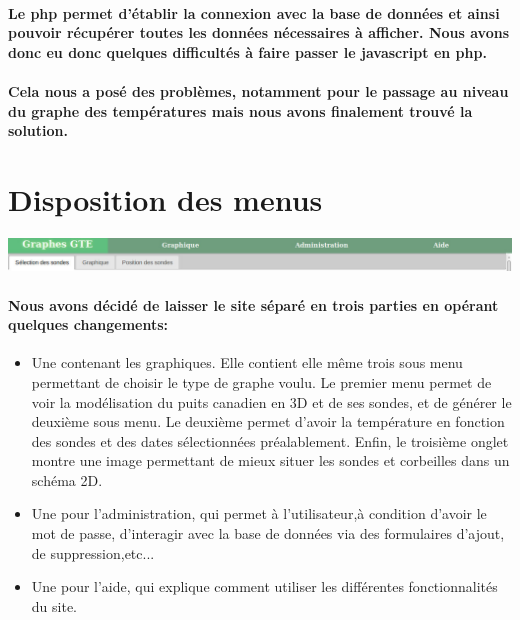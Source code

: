 \documentclass[12pt , a4paper,titlepage]{report}
\begin{document}
 \paragraph{Le php permet d’établir la connexion avec la base de données et
ainsi pouvoir récupérer toutes les données nécessaires à afficher. Nous avons donc eu donc quelques difficultés à faire passer le 
javascript en php.}
 \paragraph{Cela nous a posé des problèmes, notamment pour le passage au niveau du graphe des températures mais nous avons finalement
 trouvé la solution.}
 
 \section {Disposition des menus}
 \begin{center} \includegraphics[width=16.5cm]{menu.jpg}\end{center}
 \paragraph {   Nous avons décidé de laisser le site séparé en trois parties en opérant quelques changements: }
 \begin{itemize}
 \item Une contenant les graphiques. Elle contient elle même trois sous menu permettant de choisir le type de graphe voulu. 
 Le premier menu permet de voir la modélisation du puits canadien en 3D et de ses sondes, et de générer le deuxième sous menu. 
  Le deuxième permet d'avoir la température en fonction des sondes  et des dates sélectionnées préalablement.
   Enfin, le troisième onglet montre une image permettant de mieux situer les sondes et corbeilles dans un schéma 2D.
 \item Une pour l’administration, qui permet à l'utilisateur,à condition d'avoir le mot de passe,
  d’interagir avec la base de données via des formulaires d'ajout, de suppression,etc...
 \item Une pour l’aide, qui explique comment utiliser les différentes fonctionnalités du site.
 \end{itemize}


\end{document}

